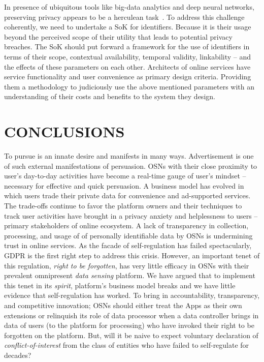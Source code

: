 \documentclass[a4paper,twoside]{article}
\begin{document}
In presence of ubiquitous tools like big-data analytics and deep
neural networks, preserving privacy appears to be a herculean
task~\cite{unique-mall,unique-crowd}. To address this challenge
coherently, we need to undertake a SoK for identifiers. Because it is
their usage beyond the perceived scope of their utility that leads to
potential privacy breaches. The SoK should put forward a framework for
the use of identifiers in terms of their scope, contextual
availability, temporal validity, linkability -- and the effects of
these parameters on each other. Architects of online services have
service functionality and user convenience as primary design
criteria. Providing them a methodology to judiciously use the above
mentioned parameters with an understanding of their costs and benefits
to the system they design.


\section{CONCLUSIONS}
\label{sec:conclusion}
\noindent To pursue is an innate desire and manifests in many
ways. Advertisement is one of such external manifestations of
persuasion. OSNs with their close proximity to user's day-to-day
activities have become a real-time gauge of user's mindset --
necessary for effective and quick persuasion. A business model has
evolved in which users trade their private data for convenience and
ad-supported services. The trade-offs continue to favor the platform
owners and their techniques to track user activities have brought in a
privacy anxiety and helplessness to users -- primary stakeholders of
online ecosystem. A lack of transparency in collection, processing, and
usage of of personally identifiable data by OSNs is undermining trust
in online services. As the facade of self-regulation has failed
spectacularly, GDPR is the first right step to address this
crisis. However, an important tenet of this regulation, \textit{right
  to be forgotten}, has very little efficacy in OSNs with their
prevalent omnipresent \textit{data sensing} platform. We have argued
that to implement this tenet in its \textit{spirit}, platform's
business model breaks and we have little evidence that self-regulation
has worked. To bring in accountability, transparency, and competitive
innovation; OSNs should either treat the Apps as their own extensions
or relinquish its role of data processor when a data controller brings
in data of users (to the platform for processing) who have invoked
their right to be forgotten on the platform. But, will it be naive to
expect voluntary declaration of \textit{conflict-of-interest} from the
class of entities who have failed to self-regulate for decades?
\end{document}

